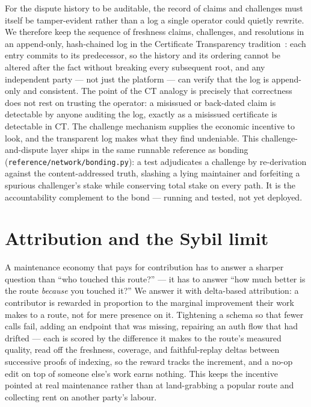 \documentclass[11pt]{article}
\begin{document}
For the dispute history to be auditable, the record of claims and challenges must
itself be tamper-evident rather than a log a single operator could quietly rewrite.
We therefore keep the sequence of freshness claims, challenges, and resolutions in
an append-only, hash-chained log in the Certificate Transparency
tradition~\cite{rfc6962}: each entry commits to its predecessor, so the history and
its ordering cannot be altered after the fact without breaking every subsequent
root, and any independent party --- not just the platform --- can verify that the
log is append-only and consistent. The point of the CT analogy is precisely that
correctness does not rest on trusting the operator: a misissued or back-dated claim
is detectable by anyone auditing the log, exactly as a misissued certificate is
detectable in CT. The challenge mechanism supplies the economic incentive to look,
and the transparent log makes what they find undeniable. This challenge-and-dispute
layer ships in the same runnable reference as bonding
(\texttt{reference/network/bonding.py}): a test adjudicates a challenge by
re-derivation against the content-addressed truth, slashing a lying maintainer and
forfeiting a spurious challenger's stake while conserving total stake on every path.
It is the accountability complement to the bond --- running and tested, not yet
deployed.

\section{Attribution and the Sybil limit}

A maintenance economy that pays for contribution has to answer a sharper question
than ``who touched this route?'' --- it has to answer ``how much better is the
route \emph{because} you touched it?'' We answer it with delta-based attribution:
a contributor is rewarded in proportion to the marginal improvement their work
makes to a route, not for mere presence on it. Tightening a schema so that fewer
calls fail, adding an endpoint that was missing, repairing an auth flow that had
drifted --- each is scored by the difference it makes to the route's measured
quality, read off the freshness, coverage, and faithful-replay deltas between
successive proofs of indexing, so the reward tracks the increment, and a no-op edit
on top of someone else's work earns nothing. This keeps the incentive pointed at
real maintenance rather than at land-grabbing a popular route and collecting rent
on another party's labour.
\end{document}
